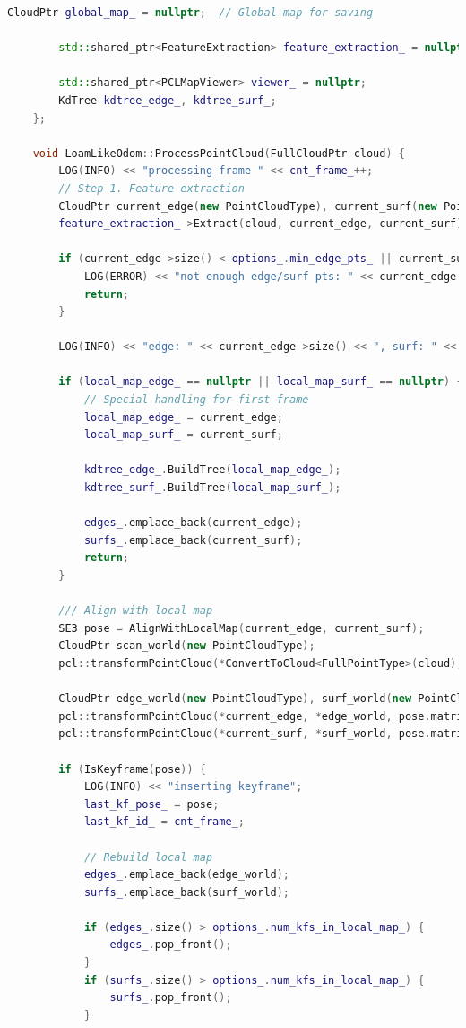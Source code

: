 \begin{lstlisting}[language=c++,caption=src/ch7/loam-like/loam\_like\_odom.cc]
		CloudPtr global_map_ = nullptr;  // Global map for saving
		
		std::shared_ptr<FeatureExtraction> feature_extraction_ = nullptr;
		
		std::shared_ptr<PCLMapViewer> viewer_ = nullptr;
		KdTree kdtree_edge_, kdtree_surf_;
	};
	
	void LoamLikeOdom::ProcessPointCloud(FullCloudPtr cloud) {
		LOG(INFO) << "processing frame " << cnt_frame_++;
		// Step 1. Feature extraction
		CloudPtr current_edge(new PointCloudType), current_surf(new PointCloudType);
		feature_extraction_->Extract(cloud, current_edge, current_surf);
		
		if (current_edge->size() < options_.min_edge_pts_ || current_surf->size() < options_.min_surf_pts_) {
			LOG(ERROR) << "not enough edge/surf pts: " << current_edge->size() << "," << current_surf->size();
			return;
		}
		
		LOG(INFO) << "edge: " << current_edge->size() << ", surf: " << current_surf->size();
		
		if (local_map_edge_ == nullptr || local_map_surf_ == nullptr) {
			// Special handling for first frame
			local_map_edge_ = current_edge;
			local_map_surf_ = current_surf;
			
			kdtree_edge_.BuildTree(local_map_edge_);
			kdtree_surf_.BuildTree(local_map_surf_);
			
			edges_.emplace_back(current_edge);
			surfs_.emplace_back(current_surf);
			return;
		}
		
		/// Align with local map
		SE3 pose = AlignWithLocalMap(current_edge, current_surf);
		CloudPtr scan_world(new PointCloudType);
		pcl::transformPointCloud(*ConvertToCloud<FullPointType>(cloud), *scan_world, pose.matrix());
		
		CloudPtr edge_world(new PointCloudType), surf_world(new PointCloudType);
		pcl::transformPointCloud(*current_edge, *edge_world, pose.matrix());
		pcl::transformPointCloud(*current_surf, *surf_world, pose.matrix());
		
		if (IsKeyframe(pose)) {
			LOG(INFO) << "inserting keyframe";
			last_kf_pose_ = pose;
			last_kf_id_ = cnt_frame_;
			
			// Rebuild local map
			edges_.emplace_back(edge_world);
			surfs_.emplace_back(surf_world);
			
			if (edges_.size() > options_.num_kfs_in_local_map_) {
				edges_.pop_front();
			}
			if (surfs_.size() > options_.num_kfs_in_local_map_) {
				surfs_.pop_front();
			}
			

\end{lstlisting}
